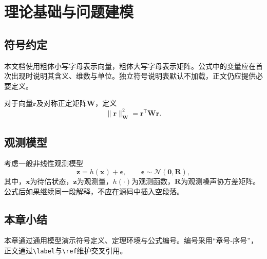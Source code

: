 \chapter{理论基础与问题建模}\label{chap:foundations}
\section{符号约定}
本文档使用粗体小写字母表示向量，粗体大写字母表示矩阵。公式中的变量应在首次出现时说明其含义、维数与单位。独立符号说明表默认不加载，正文仍应提供必要定义。

\begin{definition}[加权平方范数]
对于向量$\mathbf{r}$及对称正定矩阵$\mathbf{W}$，定义
\begin{equation}
  \lVert\mathbf{r}\rVert_{\mathbf{W}}^2
  = \mathbf{r}^{\mathsf T}\mathbf{W}\mathbf{r}.
\end{equation}
\end{definition}

\section{观测模型}
考虑一般非线性观测模型
\begin{equation}\label{eq:observation}
  \mathbf{z}=h(\mathbf{x})+\boldsymbol{\epsilon},
  \qquad \boldsymbol{\epsilon}\sim\mathcal{N}(\mathbf{0},\mathbf{R}),
\end{equation}
其中，$\mathbf{x}$为待估状态，$\mathbf{z}$为观测量，$h(\cdot)$为观测函数，$\mathbf{R}$为观测噪声协方差矩阵。公式后如果继续同一段解释，不应在源码中插入空段落。

\section{本章小结}
本章通过通用模型演示符号定义、定理环境与公式编号。编号采用“章号-序号”，正文通过\verb|\label|与\verb|\ref|维护交叉引用。
